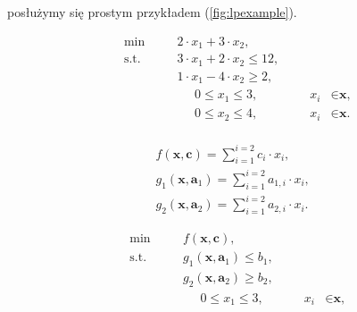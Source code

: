 posłużymy się prostym przykładem (\ref{fig:lpexample}).

\begin{figure}[!htbp]
	\null\hfill
	\begin{subfigure}[b]{0.3\textwidth}
		\begin{subequations}
			\begin{alignat*}{4}
			& \text{min} & & 2 \cdot x_{1} + 3 \cdot x_{2}\textrm{,} &&&\\
			& \text{s.t.} & \quad & 3 \cdot x_{1} + 2 \cdot x_{2} \leqslant 12\textrm{,} &&&\\
			& & \quad & 1 \cdot x_{1} - 4 \cdot x_{2} \geqslant 2\textrm{,} &&&\\
			& & & \phantom{\sum} 0 \leqslant x_{1} \leqslant 3, &\quad & x_{i} &\in \textbf{x}\textrm{,} \\
			& & & \phantom{\sum} 0 \leqslant x_{2} \leqslant 4, &\quad & x_{i} &\in \textbf{x}\textrm{.} \\
			\end{alignat*}
		\end{subequations}
		\caption{}
		\label{fig:lpexample:a}
	\end{subfigure}
	\hfill
	\begin{subfigure}[b]{0.3\textwidth}
		\begin{gather*}
		f \left( \textbf{x}, \textbf{c} \right) = \sum_{i=1}^{i=2} c_{i} \cdot x_{i}\textrm{,}\\
		g_{1} \left( \textbf{x}, \textbf{a}_{1} \right) = \sum_{i=1}^{i=2} a_{1,i} \cdot x_{i}\textrm{,}\\
		g_{2} \left( \textbf{x}, \textbf{a}_{2} \right) = \sum_{i=1}^{i=2} a_{2,i} \cdot x_{i}\textrm{.}
		\end{gather*}
		\caption{}
		\label{fig:lpexample:b}
	\end{subfigure}
	\hfill
	\begin{subfigure}[b]{0.3\textwidth}
		\begin{subequations}
			\begin{alignat*}{4}
			& \text{min} & & f \left( \textbf{x}, \textbf{c} \right)\textrm{,} &&&\\
			& \text{s.t.} & \quad & g_{1} \left( \textbf{x}, \textbf{a}_{1} \right) \leqslant b_{1}\textrm{,} &&&\\
			& & \quad & g_{2} \left( \textbf{x}, \textbf{a}_{2} \right) \geqslant b_{2}\textrm{,} &&&\\
			& & & \phantom{\sum} 0 \leqslant x_{1} \leqslant 3, &\quad & x_{i} &\in \textbf{x}\textrm{,} \\

\end{alignat*}
\end{subequations}
\end{subfigure}
\end{figure}
